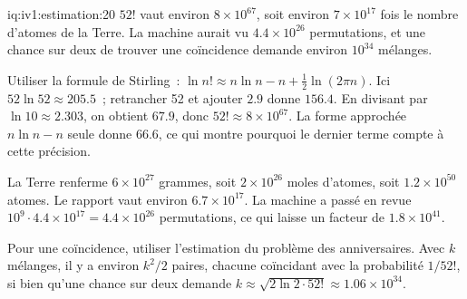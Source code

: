 \begin{solution}{iq:iv1:estimation:20}
$52!$ vaut environ $8 \times 10^{67}$, soit environ $7 \times 10^{17}$ fois le nombre d'atomes de la Terre. La machine aurait vu $4.4 \times 10^{26}$ permutations, et une chance sur deux de trouver une coïncidence demande environ $10^{34}$ mélanges.

Utiliser la formule de Stirling~: $\ln n! \approx n \ln n - n + \tfrac12 \ln(2\pi n)$. Ici $52 \ln 52 \approx 205.5$~; retrancher 52 et ajouter $2.9$ donne $156.4$. En divisant par $\ln 10 \approx 2.303$, on obtient $67.9$, donc $52! \approx 8 \times 10^{67}$. La forme approchée $n \ln n - n$ seule donne 66.6, ce qui montre pourquoi le dernier terme compte à cette précision.

La Terre renferme $6 \times 10^{27}$ grammes, soit $2 \times 10^{26}$ moles d'atomes, soit $1.2 \times 10^{50}$ atomes. Le rapport vaut environ $6.7 \times 10^{17}$. La machine a passé en revue $10^9 \cdot 4.4 \times 10^{17} = 4.4 \times 10^{26}$ permutations, ce qui laisse un facteur de $1.8 \times 10^{41}$.

Pour une coïncidence, utiliser l'estimation du problème des anniversaires. Avec $k$ mélanges, il y a environ $k^2/2$ paires, chacune coïncidant avec la probabilité $1/52!$, si bien qu'une chance sur deux demande $k \approx \sqrt{2 \ln 2 \cdot 52!} \approx 1.06 \times 10^{34}$.

\end{solution}

